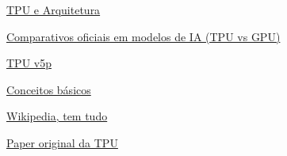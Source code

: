 \documentclass{report}
\begin{document}
\href{https://www.run.ai/guides/cloud-deep-learning/google-tpu}{TPU e Arquitetura}

\href{https://cloud.google.com/blog/products/compute/performance-per-dollar-of-gpus-and-tpus-for-ai-inference}{Comparativos oficiais em modelos de IA (TPU vs GPU)}

\href{https://canaltech.com.br/inteligencia-artificial/cloud-tpu-v5p-e-o-novo-e-mais-poderoso-acelerador-de-ia-do-google-272299/}{TPU v5p}

\href{https://cloud.google.com/tpu?hl=pt-BR}{Conceitos básicos}

\href{https://en.wikipedia.org/wiki/Tensor_Processing_Unit}{Wikipedia, tem tudo}

\href{https://arxiv.org/pdf/1704.04760}{Paper original da TPU}
\end{document}
